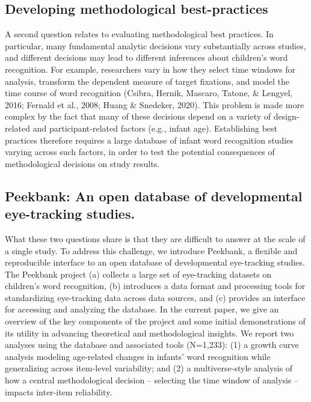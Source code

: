 \documentclass[
  english,
  man,floatsintext]{apa6}
\begin{document}
\hypertarget{developing-methodological-best-practices}{%
\subsection{Developing methodological best-practices}\label{developing-methodological-best-practices}}

A second question relates to evaluating methodological best practices. In particular, many fundamental analytic decisions vary substantially across studies, and different decisions may lead to different inferences about children's word recognition. For example, researchers vary in how they select time windows for analysis, transform the dependent measure of target fixations, and model the time course of word recognition (Csibra, Hernik, Mascaro, Tatone, \& Lengyel, 2016; Fernald et al., 2008; Huang \& Snedeker, 2020). This problem is made more complex by the fact that many of these decisions depend on a variety of design-related and participant-related factors (e.g., infant age). Establishing best practices therefore requires a large database of infant word recognition studies varying across such factors, in order to test the potential consequences of methodological decisions on study results.

\hypertarget{peekbank-an-open-database-of-developmental-eye-tracking-studies.}{%
\subsection{Peekbank: An open database of developmental eye-tracking studies.}\label{peekbank-an-open-database-of-developmental-eye-tracking-studies.}}

What these two questions share is that they are difficult to answer at the scale of a single study. To address this challenge, we introduce Peekbank, a flexible and reproducible interface to an open database of developmental eye-tracking studies. The Peekbank project (a) collects a large set of eye-tracking datasets on children's word recognition, (b) introduces a data format and processing tools for standardizing eye-tracking data across data sources, and (c) provides an interface for accessing and analyzing the database. In the current paper, we give an overview of the key components of the project and some initial demonstrations of its utility in advancing theoretical and methodological insights. We report two analyses using the database and associated tools (N=1,233): (1) a growth curve analysis modeling age-related changes in infants' word recognition while generalizing across item-level variability; and (2) a multiverse-style analysis of how a central methodological decision -- selecting the time window of analysis -- impacts inter-item reliability.
\end{document}

